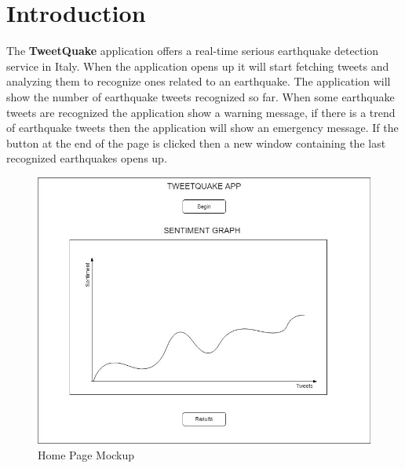 \documentclass[a4paper, oneside]{article}
\begin{document}
\baselineskip 13pt
\hypersetup{
    colorlinks=true,
    linkcolor=blue,
}

\begin{frontespizio} 
\Preambolo{\renewcommand{\frontpretitlefont}{\fontsize{15}{12}\scshape}}
\Rientro {1cm}
 \Punteggiatura {}
\end{frontespizio}


\clearpage


	\tableofcontents\thispagestyle{empty}
	\clearpage


\section{Introduction}
The \textbf{TweetQuake} application offers a real-time serious earthquake detection service in Italy. When the application opens up it will start fetching tweets and analyzing them to recognize ones related to an earthquake.
The application will show the number of earthquake tweets recognized so far. When some earthquake tweets are recognized the application show a warning message, if there is a trend of earthquake tweets then the application will show an emergency message. If the button at the end of the page is clicked then a new window containing the last recognized earthquakes opens up.
\vspace{5mm}
\begin{figure}[h]
\centering
\includegraphics[width=\textwidth]{./images/diagrams/HomeMockup} 
\caption{Home Page Mockup}
\label{fig:mockup}
\end{figure}
\end{document}
